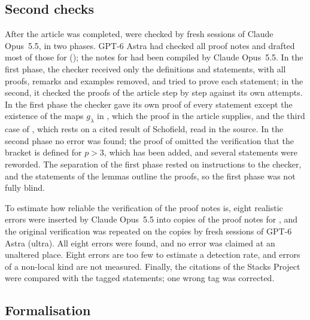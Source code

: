 \subsection*{Second checks}

After the article was completed, 
were checked by fresh sessions of Claude Opus~5.5, in two phases. GPT-6 Astra
had checked all proof notes and drafted most of those for
(); the notes for 
had been compiled by Claude Opus~5.5. In the first phase, the checker received
only the definitions and statements, with all proofs,
remarks and examples removed, and tried to prove each statement; in the
second, it checked the proofs of the article step by step against its own
attempts. In the first phase the checker gave its own proof of every
statement except the existence of the maps $g_\lambda$ in ,
which the proof in the article supplies, and the third case of , which rests on a
cited result of Schofield, read in the source. In the second phase no error
was found; the proof of  omitted the verification
that the bracket is defined for ${p>3}$, which has been added, and several
statements were reworded. The separation of the first phase rested on
instructions to the checker, and the statements of the lemmas outline the
proofs, so the first phase was not fully blind.

To estimate how reliable the verification of the proof notes is, eight
realistic errors were inserted by Claude Opus~5.5 into copies of the proof
notes for ,
and the original verification was repeated on the copies by fresh sessions of
GPT-6 Astra (ultra). All eight errors were found, and no error was claimed at
an unaltered place. Eight errors are too few to estimate a detection rate,
and errors of a non-local kind are not measured. Finally, the citations of
the Stacks Project were compared with the tagged statements; one wrong tag
was corrected.

\subsection*{Formalisation}

